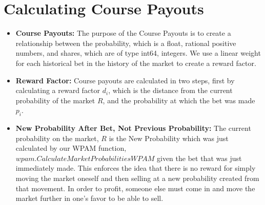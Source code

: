 \documentclass{article}
\begin{document}
\begin{center}
\end{center}

\begin{center}
\end{center}


\begin{center}
\end{center}


\section*{Calculating Course Payouts}

\begin{itemize}
    \item \textbf{Course Payouts:} The purpose of the Course Payouts is to create a relationship between the probability, which is a float, rational positive numbers, and shares, which are of type int64, integers. We use a linear weight for each historical bet in the history of the market to create a reward factor.
    \item \textbf{Reward Factor:} Course payouts are calculated in two steps, first by calculating a reward factor \(d_i\), which is the distance from the current probability of the market \(R\), and the probability at which the bet was made \(p_i\).
    \item \textbf{New Probability After Bet, Not Previous Probability:} The current probability on the market, \(R\) is the New Probability which was just calculated by our WPAM function, \(wpam.CalculateMarketProbabilitiesWPAM\) given the bet that was just immediately made. This enforces the idea that there is no reward for simply moving the market oneself and then selling at a new probability created from that movement. In order to profit, someone else must come in and move the market further in one's favor to be able to sell.
\end{itemize}
\end{document}
